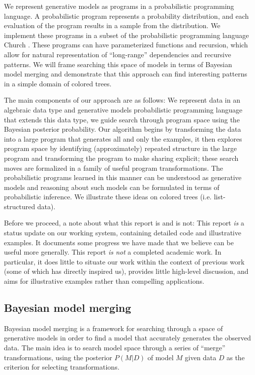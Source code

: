 \documentclass[a4paper,10pt]{article}
\begin{document}
We represent generative models as programs in a probabilistic programming language. A probabilistic program represents a probability distribution, and each evaluation of the program results in a sample from the distribution. We implement these programs in a subset of the probabilistic programming language Church \cite{N.D.Goodman:2008:f2a0d}.  
These programs can have parameterized functions and recursion, which allow for natural representation of ``long-range'' dependencies and recursive patterns.  We will frame searching this space of models in terms of Bayesian model merging \cite{Stolcke:1994:IPG:645515.658235} and demonstrate that this approach can find interesting patterns in a simple domain of colored trees.

The main components of our approach are as follows: We represent data in an algebraic data type and generative models probabilistic programming language that extends this data type, we guide search through program space using the Bayesian posterior probability. Our algorithm begins by transforming the data into a large program that generates all and only the examples, it then explores program space by identifying (approximately) repeated structure in the large program and transforming the program to make sharing explicit; these search moves are formalized in a family of useful program transformations.
The probabilistic programs learned in this manner can be understood as generative models and reasoning about such models can be formulated in terms of probabilistic inference. We illustrate these ideas on colored trees (i.e. list-structured data).

Before we proceed, a note about what this report is and is not: This report \emph{is} a status update on our working system, containing detailed code and illustrative examples. It documents some progress we have made that we believe can be useful more generally.
This report \emph{is not} a completed academic work. In particular, it does little to situate our work within the context of previous work (some of which has  directly inspired us), provides little high-level discussion, and aims for illustrative examples rather than compelling applications.

\subsection{Bayesian model merging}

Bayesian model merging \cite{Stolcke:1994:IPG:645515.658235} is a framework for searching through a space of generative models in order to find a model that accurately generates the observed data.  The main idea is to search model space through a series of ``merge'' transformations, using the posterior $P(M|D)$ of model $M$ given data $D$ as the criterion for selecting transformations.
\end{document}
